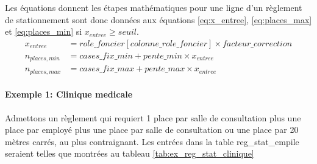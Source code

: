     \FloatBarrier
    Les équations donnent les étapes mathématiques pour une ligne d'un règlement de stationnement sont donc données aux équations \ref{eq:x_entree}, \ref{eq:places_max} et \ref{eq:places_min} si $x_{entree} \geq seuil $.
    \begin{align}
        x_{entree} &= role\_foncier[colonne\_role\_foncier] \times facteur\_correction \label{eq:x_entree}\\
        n_{places,min} &= cases\_fix\_min + pente\_min \times x_{entree} \label{eq:places_min}\\
        n_{places,max} &= cases\_fix\_max + pente\_max \times x_{entree} \label{eq:places_max}
    \end{align}
    
    \paragraph{Exemple 1: Clinique medicale} Admettons un règlement qui requiert 1 place par salle de consultation  plus une place par employé plus une place par salle de consultation ou une place par 20 mètres carrés, au plus contraignant. Les entrées dans la table reg\_stat\_empile seraient telles que montrées au tableau \ref{tab:ex_reg_stat_clinique}
